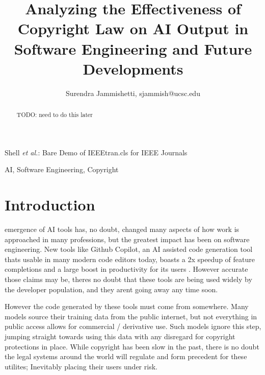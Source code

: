 \documentclass[journal]{IEEEtran}
\begin{document}
\title{Analyzing the Effectiveness of Copyright Law on AI Output in Software
Engineering and Future Developments}

\author{Surendra Jammishetti, sjammish@ucsc.edu}%
        
{Shell \MakeLowercase{\textit{et al.}}: Bare Demo of IEEEtran.cls for IEEE Journals}

\maketitle

\begin{abstract}
TODO: need to do this later
\end{abstract}

\begin{IEEEkeywords}
AI, Software Engineering, Copyright
\end{IEEEkeywords}

\section{Introduction}
%
% 

 emergence of AI tools has, no doubt, changed many aspects of
how work is approached in many professions, but the greatest impact has been on
software engineering. New tools like Github Copilot, an AI assisted code generation
tool thats usable in many modern code editors today, boasts a 2x speedup of feature
completions and a large boost in productivity for its users \cite{github}. However
accurate those claims may be, theres no doubt that these tools are being used
widely by the developer population, and they arent going away any time soon.


However the code generated by these tools must come from somewhere. Many models
source their training data from the public internet, but not everything in public access
allows for commercial / derivative use. Such models ignore this step,
jumping straight towards using this data with any disregard for copyright protections in place.
While copyright has been slow in the past, there is no doubt the legal systems around the world
will regulate and form precedent for these utilites; Inevitably placing their users
under risk.
\end{document}
